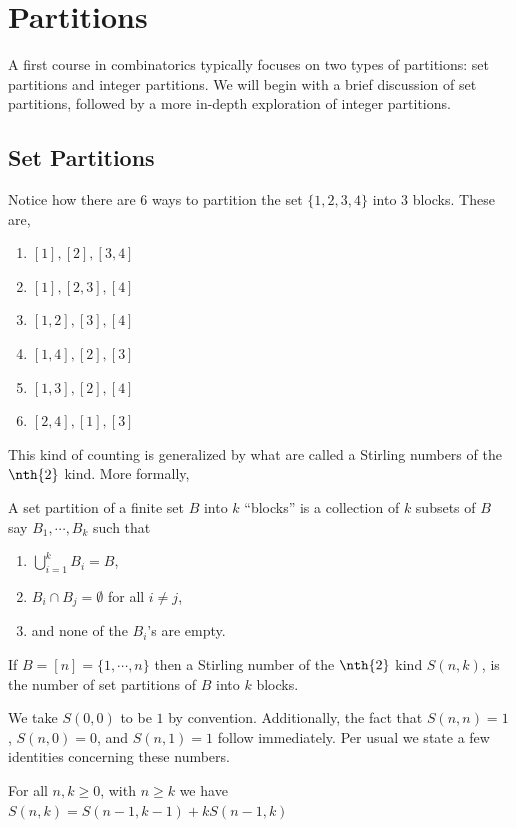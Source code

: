 \chapter{Partitions}
A first course in combinatorics typically focuses on two types of partitions: set partitions and integer partitions. We will begin with a brief discussion of set partitions, followed by a more in-depth exploration of integer partitions. 
\section{Set Partitions}
Notice how there are $6$ ways to partition the set $\{1,2,3,4\}$ into $3$ blocks. These are,
    \begin{enumerate}
        \item $[1],[2],[3,4]$
        \item $[1],[2,3],[4]$
        \item $[1,2],[3],[4]$
        \item $[1,4],[2],[3]$
        \item $[1,3],[2],[4]$
        \item $[2,4],[1],[3]$
    \end{enumerate}
This kind of counting is generalized by what are called a Stirling numbers of the $\nth{2}$ kind. More formally,
\begin{definition}
A set partition of a finite set $B$ into $k$ ``blocks'' is a collection of $k$ subsets of $B$ say $B_1,\cdots,B_k$ such that 
\begin{enumerate}
    \item $\bigcup_{i=1}^kB_i = B$,
    \item $B_i\cap B_j=\emptyset$ for all $i\neq j$,
    \item and none of the $B_i$'s are empty. 
\end{enumerate}
\end{definition}
\begin{definition}
If $B=[n]=\{1,\cdots,n\}$ then a Stirling number of the $\nth{2}$ kind $S(n,k)$, is the number of set partitions of $B$ into $k$ blocks.
\label{d:Str2}
\end{definition}
We take $S(0,0)$ to be $1$ by convention. Additionally, the fact that $S(n,n)=1$, $S(n,0)=0$, and $S(n,1)=1$ follow immediately. Per usual we state a few identities concerning these numbers.
\begin{claim}
For all $n,k\geq 0$, with $n\geq k$ we have $S(n,k)=S(n-1,k-1)+kS(n-1,k)$
\end{claim}
